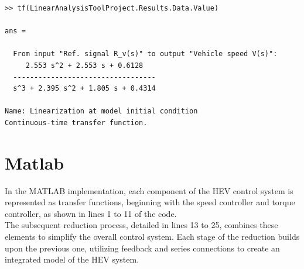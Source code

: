 \documentclass[a4paper, 12pt, english]{article}
\begin{document}
\begin{lstlisting}[style=commandstyle,caption={Transfer function},captionpos=b]
>> tf(LinearAnalysisToolProject.Results.Data.Value)

ans =
 
  From input "Ref. signal R_v(s)" to output "Vehicle speed V(s)":
     2.553 s^2 + 2.553 s + 0.6128
  ----------------------------------
  s^3 + 2.395 s^2 + 1.805 s + 0.4314
 
Name: Linearization at model initial condition
Continuous-time transfer function.
\end{lstlisting} 

\section{Matlab}

In the MATLAB implementation, each component of the HEV control system is represented as transfer functions, beginning with the speed controller and torque controller, as shown in lines 1 to 11 of the code. \\

The subsequent reduction process, detailed in lines 13 to 25, combines these elements to simplify the overall control system. Each stage of the reduction builds upon the previous one, utilizing feedback and series connections to create an integrated model of the HEV system.\\
\end{document}
